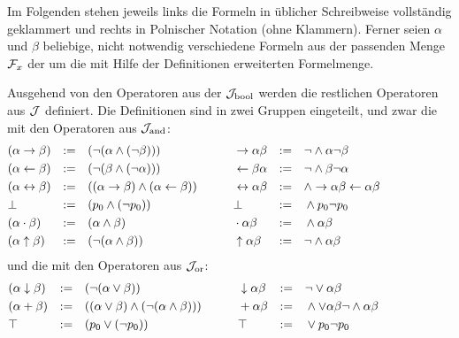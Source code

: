 Im Folgenden stehen jeweils links die Formeln in üblicher Schreibweise vollständig geklammert und rechts in Polnischer Notation (ohne Klammern).
Ferner seien $\alpha$ und $\beta$ beliebige, nicht notwendig verschiedene Formeln aus der passenden Menge $\mathcal{F}_x$ \textbzw der um die mit Hilfe der Definitionen erweiterten Formelmenge.

Ausgehend von den Operatoren aus der  $\mathcal{J}_{\mathrm{bool}}$ werden die restlichen Operatoren aus $\mathcal{J}$ definiert. Die Definitionen sind in zwei Gruppen eingeteilt, und zwar die mit den Operatoren aus $\mathcal{J}_{\mathrm{and}}$:
\begin{align}
	& (\alpha \rightarrow \beta) & := & & & (\lnot (\alpha \land  (\lnot \beta)))
	& &&&&
	&  \rightarrow \alpha \beta  & := & & &  \lnot    \land \alpha \lnot \beta
	\label{def:imp}
	\\
	& (\alpha \leftarrow \beta) & := & & & (\lnot (\beta \land  (\lnot \alpha)))
	& &&&&
	&   \leftarrow \beta \alpha & := & & &  \lnot    \land \beta \lnot \alpha
	\label{def:rep}
	\\
	& (\alpha\leftrightarrow\beta)&:= &&&((\alpha\rightarrow\beta)\land(\alpha\leftarrow\beta))
	& &&&&
	& \leftrightarrow\alpha \beta &:= &&&\land \rightarrow \alpha \beta \leftarrow \alpha \beta
	\label{def:equiv}
	\\
	&              \bot & := & & & (p_0 \land    (\lnot p_0))
	& &&&&
	&              \bot & := & & &      \land p_0 \lnot p_0
	\label{def:false}
	\\
	& (\alpha \cdot \beta) & := & & & (\alpha \land \beta)
	& &&&&
	&  \cdot \alpha \beta  & := & & &  \land \alpha \beta
	\label{def:mult}
	\\
	& (\alpha \uparrow \beta)  & := & & & (\lnot (\alpha \land \beta ))
	& &&&&
	&  \uparrow \alpha \beta   & := & & &  \lnot  \land \alpha \beta
	\label{def:nand}
	&&&&&&&&&&
\end{align}
und die mit den Operatoren aus $\mathcal{J}_{\mathrm{or}}$:
\begin{align}
	& (\alpha \downarrow \beta) & := & & & (\lnot (\alpha \lor \beta))
	& &&&&
	&  \downarrow \alpha \beta  & := & & &  \lnot  \lor \alpha \beta
	\label{def:nor}
	\\
	&(\alpha+\beta)&:=&&&((\alpha\lor\beta)\land(\lnot(\alpha\land\beta)))
	& &&&&
	& +\alpha\beta &:=&&&  \land \lor \alpha\beta \lnot \land \alpha\beta
	\label{def:add}
	\\
	& \top & := & & & (p_0 \lor    (\lnot p_0))
	& &&&&
	& \top & := & & &      \lor p_0 \lnot p_0
	\label{def:true}
	&&&&&&&&&&
\end{align}

